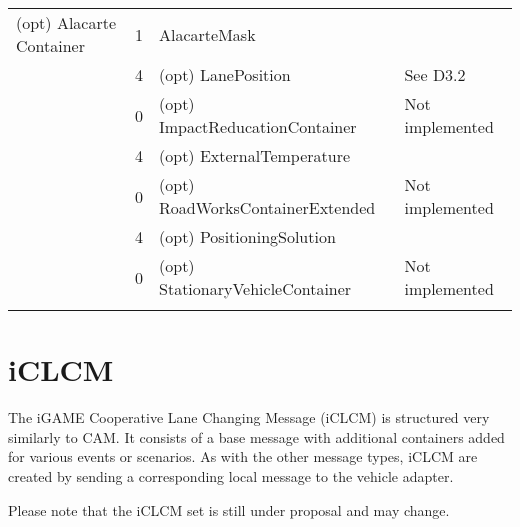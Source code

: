 \documentclass[11pt]{article}
\begin{document}
\begin{center}
\begin{tabular}{lrll}
\hline
(opt) Alacarte Container & 1 & AlacarteMask & \\
 & 4 & (opt) LanePosition & See D3.2\\
 & 0 & (opt) ImpactReducationContainer & Not implemented\\
 & 4 & (opt) ExternalTemperature & \\
 & 0 & (opt) RoadWorksContainerExtended & Not implemented\\
 & 4 & (opt) PositioningSolution & \\
 & 0 & (opt) StationaryVehicleContainer & Not implemented\\
 &  &  & \\
\end{tabular}
\end{center}
\newpage

\section{iCLCM}
\label{sec:orgheadline4}
The iGAME Cooperative Lane Changing Message (iCLCM) is structured very
similarly to CAM. It consists of a base message with additional
containers added for various events or scenarios. As with the other
message types, iCLCM are created by sending a corresponding local
message to the vehicle adapter.

Please note that the iCLCM set is still under proposal and may change.
\end{document}
